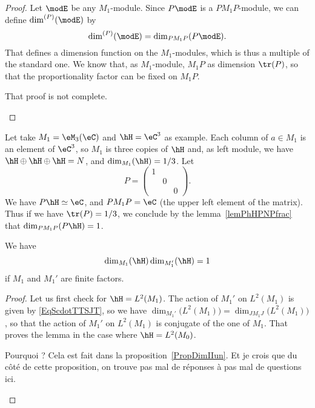 \begin{proof}
Let $\modE$ be any $M_1$-module. Since $P\modE$ is a $PM_1P$-module, we can define $\dim^{(P)}(\modE)$ by
\begin{equation}
	\dim^{(P)}(\modE)=\dim_{PM_1P}(P\modE).
\end{equation}
That defines a dimension function on the $M_1$-modules, which is thus a multiple of the standard one. We know that, as $M_1$-module, $M_1P$ as dimension $\tr(P)$, so that the proportionality factor can be fixed on $M_1P$.

\begin{probleme}
	That proof is not complete.
\end{probleme}
\end{proof}

Let take $M_1=\eM_3(\eC)$ and $\hH=\eC^3$ as example. Each column of $a\in M_1$ is an element of $\eC^3$, so $M_1$ is three copies of $\hH$ and, as left module, we have $\hH\oplus\hH\oplus\hH=N$, and $\dim_{M_1}(\hH)=1/3$. Let
\[
	P=
\begin{pmatrix}
  1	&		&	\\
  	&	0	&	\\
 	&		& 0
\end{pmatrix}.
\]
We have $P\hH\simeq \eC$, and $PM_1P=\eC$ (the upper left element of the matrix). Thus if we have $\tr(P)=1/3$, we conclude by the lemma~\ref{lemPhHPNPfrac} that $\dim_{PM_1P}(P\hH)=1$.

\begin{lemma}
We have
\begin{equation}
	\dim_{M_1}(\hH)\dim_{M_1'}(\hH)=1
\end{equation}
if $M_1$ and $M_1'$ are finite factors.
\end{lemma}

\begin{proof}
Let us first check for $\hH=L^2(M_1)$. The action of $M_1'$ on $L^2(M_1)$ is given by \eqref{EqScdotTTSJT}, so we have $\dim_{M_1'}\big( L^2(M_1) \big)=\dim_{JM_1J}\big( L^2(M_1) \big)$, so that the action of $M_1'$ on $L^2(M_1)$ is conjugate of the one of $M_1$. That proves the lemma in the case where $\hH=L^2(M_0)$.

\begin{probleme}
Pourquoi ? Cela est fait dans la proposition~\ref{PropDimIIun}. Et je crois que du côté de cette proposition, on trouve pas mal de réponses à pas mal de questions ici.
\end{probleme}

\end{proof}

